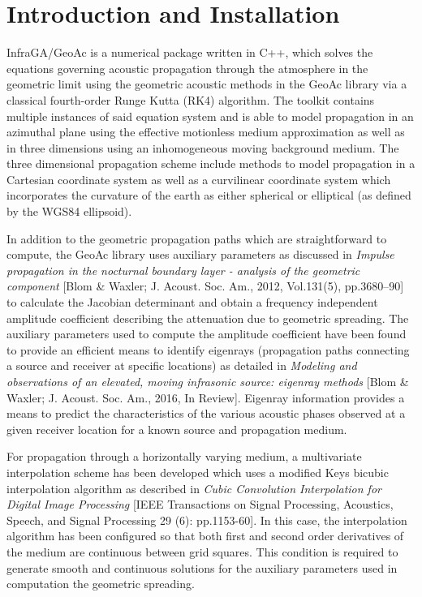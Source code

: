 \documentclass[10pt]{article}
\begin{document}
\newpage

\tableofcontents

\newpage
\section{Introduction and Installation}
\label{Sect:Intro_Install}
\hspace*{0.25in}  InfraGA/GeoAc is a numerical package written in C++, which solves the equations governing acoustic propagation through the atmosphere in the geometric limit using the geometric acoustic methods in the GeoAc library via a classical fourth-order Runge Kutta (RK4) algorithm.  The toolkit contains multiple instances of said equation system and is able to model propagation in an azimuthal plane using the effective motionless medium approximation as well as in three dimensions using an inhomogeneous moving background medium.  The three dimensional propagation scheme include methods to model propagation in a Cartesian coordinate system as well as a curvilinear coordinate system which incorporates the curvature of the earth as either spherical or elliptical (as defined by the WGS84 ellipsoid). 

In addition to the geometric propagation paths which are straightforward to compute, the GeoAc library uses auxiliary parameters as discussed in \textit{Impulse propagation in the nocturnal boundary layer - analysis of the geometric component} [Blom \& Waxler; J. Acoust. Soc. Am., 2012, Vol.131(5), pp.3680--90] to calculate the Jacobian determinant and obtain a frequency independent amplitude coefficient describing the attenuation due to geometric spreading.  The auxiliary parameters used to compute the amplitude coefficient have been found to provide an efficient means to identify eigenrays (propagation paths connecting a source and receiver at specific locations) as detailed in \textit{Modeling and observations of an elevated, moving infrasonic source: eigenray methods} [Blom \& Waxler; J. Acoust. Soc. Am., 2016, In Review].  Eigenray information provides a means to predict the characteristics of the various acoustic phases observed at a given receiver location for a known source and propagation medium.

For propagation through a horizontally varying medium, a multivariate interpolation scheme has been developed which uses a modified Keys bicubic interpolation algorithm as described in \textit{Cubic Convolution Interpolation for Digital Image Processing}  [IEEE Transactions on Signal Processing, Acoustics, Speech, and Signal Processing 29 (6): pp.1153-60].  In this case, the interpolation algorithm has been configured so that both first and second order derivatives of the medium are continuous between grid squares.  This condition is required to generate smooth and continuous solutions for the auxiliary parameters used in computation the geometric spreading.
\end{document}
